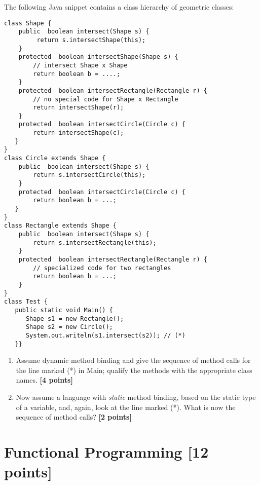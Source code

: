 \documentclass{article}
\begin{document}
\begin{enumerate}
The following Java snippet contains a class hierarchy of geometric classes:

{\small
\begin{verbatim}
class Shape {
    public  boolean intersect(Shape s) {
         return s.intersectShape(this);
    }
    protected  boolean intersectShape(Shape s) {
        // intersect Shape x Shape
        return boolean b = ....;
    }
    protected  boolean intersectRectangle(Rectangle r) {
        // no special code for Shape x Rectangle
        return intersectShape(r);
    }
    protected  boolean intersectCircle(Circle c) {
        return intersectShape(c);
   }
}
class Circle extends Shape { 
    public  boolean intersect(Shape s) {
        return s.intersectCircle(this);  
    }
    protected  boolean intersectCircle(Circle c) {
        return boolean b = ...;
   }  
}
class Rectangle extends Shape {
    public  boolean intersect(Shape s) {
        return s.intersectRectangle(this);  
    }
    protected  boolean intersectRectangle(Rectangle r) {
        // specialized code for two rectangles
        return boolean b = ...;
    }
}
class Test {
   public static void Main() {
      Shape s1 = new Rectangle(); 
      Shape s2 = new Circle();
      System.out.writeln(s1.intersect(s2)); // (*)
   }}
\end{verbatim}
}
\begin{enumerate}
\item Assume dynamic method binding and give the sequence of method calls for the line marked (*) in
\textsf{Main}; qualify the methods with the appropriate class names. {\textbf{[4 points]}}
\item Now assume a language with \textit{static} method binding, based on the
static type of a variable, and, again, look at
the line marked (*). What is now the sequence of method calls?
 {\textbf{[2 points]}}
\end{enumerate}

\end{enumerate}

\newpage
\section{Functional Programming [12 points]}
\end{document}
